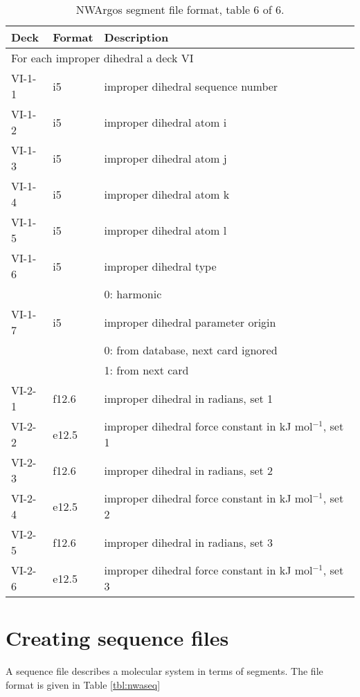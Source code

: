 \begin{table}[htbp]
\center

\label{tbl:nwaseg6}

\begin{tabular*}{150mm}{p{12mm}p{12mm}l}
\hline\hline
Deck & Format & Description \\ \hline
\multicolumn{3}{l}{For each improper dihedral a deck VI} \\
VI-1-1 & i5     & improper dihedral sequence number \\
VI-1-2 & i5     & improper dihedral atom i \\
VI-1-3 & i5     & improper dihedral atom j \\
VI-1-4 & i5     & improper dihedral atom k \\
VI-1-5 & i5     & improper dihedral atom l \\
VI-1-6 & i5     & improper dihedral type \\
       &        & 0: harmonic\\
VI-1-7 & i5     & improper dihedral parameter origin\\
       &        & 0: from database, next card ignored \\
       &        & 1: from next card\\
VI-2-1 & f12.6  & improper dihedral in radians, set 1\\
VI-2-2 & e12.5  & improper dihedral force constant in kJ mol$^{-1}$, set 1 \\
VI-2-3 & f12.6  & improper dihedral in radians, set 2\\
VI-2-4 & e12.5  & improper dihedral force constant in kJ mol$^{-1}$, set 2 \\
VI-2-5 & f12.6  & improper dihedral in radians, set 3\\
VI-2-6 & e12.5  & improper dihedral force constant in kJ mol$^{-1}$, set 3 \\
\hline\hline
\end{tabular*}

\caption{NWArgos segment file format, table 6 of 6.}

\end{table}


\section{Creating sequence files}
A sequence file describes a molecular system in terms of segments. The
file format is given in Table \ref{tbl:nwaseq}

